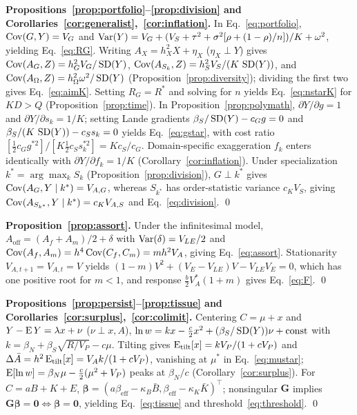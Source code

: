 \noindent\textbf{Propositions~\ref{prop:portfolio}--\ref{prop:division} and Corollaries~\ref{cor:generalist},~\ref{cor:inflation}.} In Eq.~\eqref{eq:portfolio}, $\operatorname{Cov}(G,Y)=V_G$ and $\operatorname{Var}(Y)=V_G+(V_S+\tau^2+\sigma^2[\rho+(1-\rho)/n])/K+\omega^2$, yielding Eq.~\eqref{eq:RG}. Writing $A_X=h_X^2X+\eta_X$ ($\eta_X\perp Y$) gives $\operatorname{Cov}(A_G,Z)=h_G^2V_G/\operatorname{SD}(Y)$, $\operatorname{Cov}(A_{S_k},Z)=h_S^2V_S/(K\,\operatorname{SD}(Y))$, and $\operatorname{Cov}(A_\Omega,Z)=h_\Omega^2\omega^2/\operatorname{SD}(Y)$ (Proposition~\ref{prop:diversity}); dividing the first two gives Eq.~\eqref{eq:aimK}. Setting $R_G=R^*$ and solving for $n$ yields Eq.~\eqref{eq:nstarK} for $KD>Q$ (Proposition~\ref{prop:time}). In Proposition~\ref{prop:polymath}, $\partial Y/\partial g=1$ and $\partial Y/\partial s_k=1/K$; setting Lande gradients $\beta_S/\operatorname{SD}(Y)-c_Gg=0$ and $\beta_S/(K\,\operatorname{SD}(Y))-c_Ss_k=0$ yields Eq.~\eqref{eq:gstar}, with cost ratio $[\tfrac12c_Gg^{*2}]/[K\tfrac12c_Ss_k^{*2}]=Kc_S/c_G$. Domain-specific exaggeration $f_k$ enters identically with $\partial Y/\partial f_k=1/K$ (Corollary~\ref{cor:inflation}). Under specialization $k^*=\arg\max_k S_k$ (Proposition~\ref{prop:division}), $G\perp k^*$ gives $\operatorname{Cov}(A_G,Y\mid k^*)=V_{A,G}$, whereas $S_{k^*}$ has order-statistic variance $c_KV_S$, giving $\operatorname{Cov}(A_{S_{k^*}},Y\mid k^*)=c_KV_{A,S}$ and Eq.~\eqref{eq:division}. \qed

\noindent\textbf{Proposition~\ref{prop:assort}.} Under the infinitesimal model, $A_{\text{off}}=(A_f+A_m)/2+\delta$ with $\operatorname{Var}(\delta)=V_{LE}/2$ and $\operatorname{Cov}(A_f,A_m)=h^4\operatorname{Cov}(C_f,C_m)=mh^2V_A$, giving Eq.~\eqref{eq:assort}. Stationarity $V_{A,t+1}=V_{A,t}=V$ yields $(1-m)V^2+(V_E-V_{LE})V-V_{LE}V_E=0$, which has one positive root for $m<1$, and response $\tfrac b2V_A^*(1+m)$ gives Eq.~\eqref{eq:F}. \qed

\noindent\textbf{Propositions~\ref{prop:persist}--\ref{prop:tissue} and Corollaries~\ref{cor:surplus},~\ref{cor:colimit}.} Centering $C=\mu+x$ and $Y-\operatorname{E} Y=\lambda x+\nu$ ($\nu\perp x,A$), $\ln w=kx-\tfrac c2x^2+(\beta_S/\operatorname{SD}(Y))\nu+\text{const}$ with $k=\beta_N+\beta_S\sqrt{R/V_P}-c\mu$. Tilting gives $\operatorname{E}_{\text{tilt}}[x]=kV_P/(1+cV_P)$ and $\Delta\bar A=h^2\operatorname{E}_{\text{tilt}}[x]=V_Ak/(1+cV_P)$, vanishing at $\mu^*$ in Eq.~\eqref{eq:mustar}; $\operatorname{E}[\ln w]=\beta_N\mu-\tfrac c2(\mu^2+V_P)$ peaks at $\beta_N/c$ (Corollary~\ref{cor:surplus}). For $C=aB+K+E$, $\bm\beta=(a\beta_{\mathrm{eff}}-\kappa_B\bar B,\beta_{\mathrm{eff}}-\kappa_K\bar K)^\top$; nonsingular $\mathbf G$ implies $\mathbf G\bm\beta=\mathbf 0\iff\bm\beta=\mathbf 0$, yielding Eq.~\eqref{eq:tissue} and threshold~\eqref{eq:threshold}. \qed

